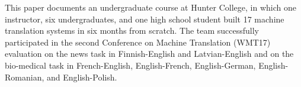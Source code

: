 This paper documents an undergraduate course at Hunter College, in which one instructor, six undergraduates, and one high school student built 17 machine translation systems in six months from scratch. The team successfully participated in the second Conference on Machine Translation (WMT17) evaluation on the news task in Finnish-English and Latvian-English and on the bio-medical task in French-English, English-French, English-German, English-Romanian, and English-Polish.
